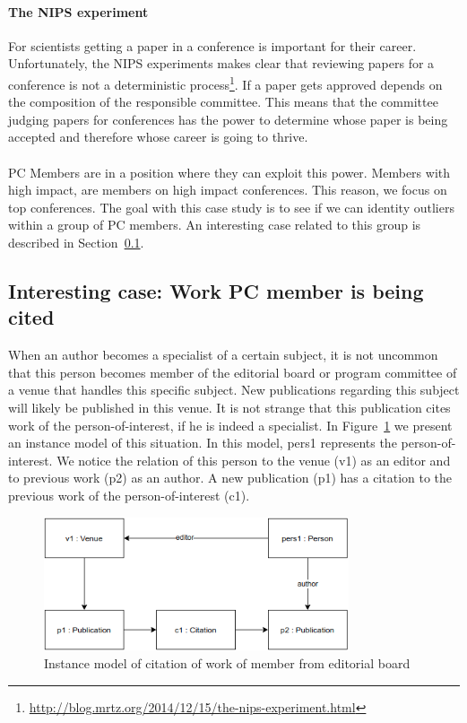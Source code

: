 \documentclass{ou-report}
\begin{document}
\paragraph{The NIPS experiment}
For scientists getting a paper in a conference is important for their career. 
Unfortunately, the NIPS experiments makes clear that reviewing papers for a 
conference is not a deterministic
process\footnote{\url{http://blog.mrtz.org/2014/12/15/the-nips-experiment.html}}.
If a paper gets approved depends on the composition of the 
responsible committee. This means that the committee judging papers for 
conferences has the power to determine whose paper is being accepted and 
therefore whose career is going to thrive.

\paragraph{}
PC Members are in a position where they can exploit this power. Members with
high impact, are members on high impact conferences. This reason, we focus on
top conferences. The goal with this case study is to see if we can identity outliers 
within a group of PC members.
An interesting case related to this group is described in 
Section~\ref{interesting_case:work_member_editorial_board_cited}.

\subsection{Interesting case: Work PC member is being cited}
\label{interesting_case:work_member_editorial_board_cited}
When an author becomes a specialist of a certain subject, it is not uncommon 
that this person becomes member of the editorial board or program committee of a 
venue that handles this specific subject.
New publications regarding this subject will likely be published in this venue. 
It is not strange that this publication cites work of the person-of-interest, if 
he is indeed a specialist.
In Figure~\ref{fig:cweb} we present an instance model of this situation. In this 
model, pers1 represents the person-of-interest. We notice the relation of this 
person to the venue (v1) as an editor and to previous work (p2) as an author. A 
new publication (p1) has a citation to the previous work of the 
person-of-interest (c1).

\begin{figure}[H]
\centering
\includegraphics[width=9cm]{images/cite_work_editorial_board.drawio.png}
\caption{Instance model of citation of work of member from editorial board}
\label{fig:cweb}
\end{figure}
\end{document}
